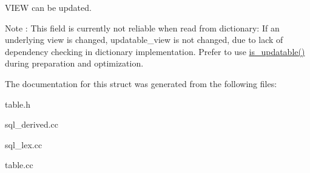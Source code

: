 V\+I\+EW can be updated. 

\begin{DoxyNote}{Note}
\+: This field is currently not reliable when read from dictionary\+: If an underlying view is changed, updatable\+\_\+view is not changed, due to lack of dependency checking in dictionary implementation. Prefer to use \mbox{\hyperlink{structTABLE__LIST_ab245bbe722912873c8e5ed62d7b083b0}{is\+\_\+updatable()}} during preparation and optimization. 
\end{DoxyNote}


The documentation for this struct was generated from the following files\+:\begin{DoxyCompactItemize}
\item 
table.\+h\item 
sql\+\_\+derived.\+cc\item 
sql\+\_\+lex.\+cc\item 
table.\+cc\end{DoxyCompactItemize}
